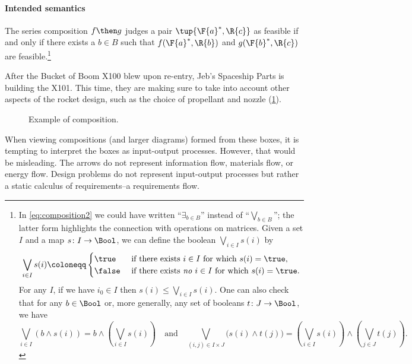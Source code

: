 \paragraph{Intended semantics}
The series composition $f\then g$ judges a pair $\tup{\F{a}^*,\R{c}}$ as feasible if and only if there exists a $b \in B$ such that $f(\F{a}^*,\R{b})$ and $g(\F{b}^*,\R{c})$ are feasible.\footnote{In \eqref{eq:composition2} we could have written ``$\exists_{b\in B}$''
instead of ``$\bigvee_{b\in B}$''; the latter form highlights the connection
with operations on matrices. Given a set $I$ and a map $s\colon I\to\Bool$, we can define the boolean $\bigvee_{i\in I}s(i)$ by
\begin{equation*}
 \bigvee_{i\in I}s(i)\coloneqq
 \begin{cases}
 	\true&\text{ if there exists }i\in I\text{ for which }s(i)=\true,\\
 	\false&\text{ if there exists \emph{no} }i\in I\text{ for which }s(i)=\true.
 \end{cases}
 \end{equation*}
 For any $I$, if we have $i_0\in I$ then $s(i)\leq\bigvee_{i\in I}s(i)$. One can also check that for any $b\in\Bool$ or, more generally, any set of booleans $t\colon J\to\Bool$, we have
 \begin{equation*}
     \bigvee_{i\in I}(b\wedge s(i))=b\wedge\left(\bigvee_{i\in I}s(i)\right)
 \quad\text{and}\quad
 \bigvee_{(i,j)\in I\times  J}\big(s(i)\wedge t(j)\big)=\left(\bigvee_{i\in I}s(i)\right)\wedge\left(\bigvee_{j\in J} t(j)\right).
 \end{equation*}
}

\begin{example}
After the Bucket of Boom X100 blew upon re-entry, Jeb's Spaceship Parts is building the X101. This time, they are making sure to take into account other aspects of the rocket design, such as the choice of propellant and nozzle (\cref{fig:examplecomposition}).
\begin{figure}[h!]
\begin{center}
\end{center}
\caption{Example of composition. \label{fig:examplecomposition}}
\end{figure}
\end{example}

\begin{remark}
When viewing compositions (and larger diagrams) formed from these boxes, it is tempting to interpret the boxes as input-output processes. However, that would be misleading. The arrows do not represent information flow, materials flow, or energy flow. Design problems do not represent input-output processes but rather a static calculus of requirements--a requirements flow.
\end{remark}

